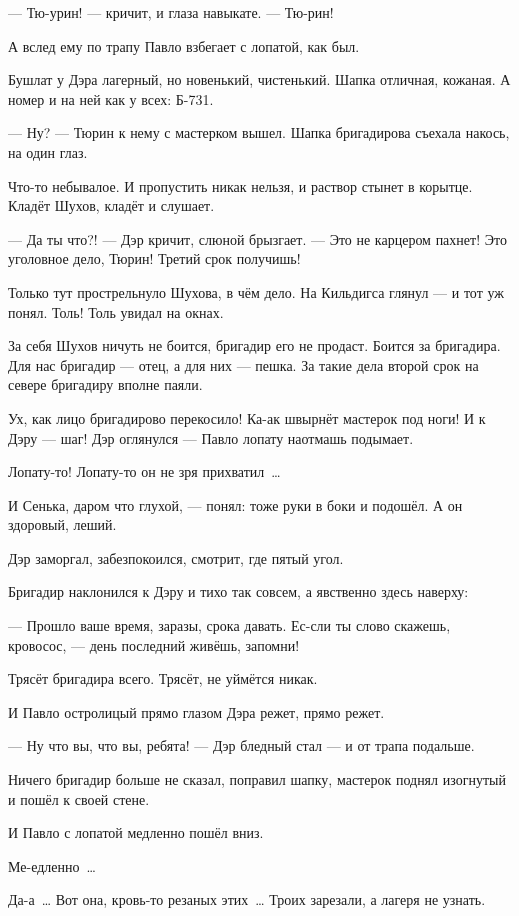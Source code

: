 --- Тю-урин! --- кричит, и глаза навыкате. --- Тю-рин!

А вслед ему по трапу Павло взбегает с лопатой, как был.

Бушлат у Дэра лагерный, но новенький, чистенький. Шапка отличная, кожаная. А номер и на ней 
как у всех: Б-731.

--- Ну? --- Тюрин к нему с мастерком вышел. Шапка бригадирова съехала накось, на один глаз.

Что-то небывалое. И пропустить никак нельзя, и раствор стынет в корытце. Кладёт Шухов, кладёт 
и слушает.

--- Да ты что?! --- Дэр кричит, слюной брызгает. --- Это не карцером пахнет! Это уголовное дело, 
Тюрин! Третий срок получишь!

Только тут прострельнуло Шухова, в чём дело. На Кильдигса глянул --- и тот уж понял. Толь! Толь 
увидал на окнах.

За себя Шухов ничуть не боится, бригадир его не продаст. Боится за бригадира. Для нас 
бригадир --- отец, а для них --- пешка. За такие дела второй срок на севере бригадиру вполне 
паяли.

Ух, как лицо бригадирово перекосило! Ка-ак швырнёт мастерок под ноги! И к Дэру --- шаг! Дэр 
оглянулся --- Павло лопату наотмашь подымает.

Лопату-то! Лопату-то он не зря прихватил~\dots{}

И Сенька, даром что глухой, --- понял: тоже руки в боки и подошёл. А он здоровый, леший.

Дэр заморгал, забезпокоился, смотрит, где пятый угол.

Бригадир наклонился к Дэру и тихо так совсем, а явственно здесь наверху:

--- Прошло ваше время, заразы, срока давать. Ес-сли ты слово скажешь, кровосос, --- день 
последний живёшь, запомни!

Трясёт бригадира всего. Трясёт, не уймётся никак.

И Павло остролицый прямо глазом Дэра режет, прямо режет.

--- Ну что вы, что вы, ребята! --- Дэр бледный стал --- и от трапа подальше.

Ничего бригадир больше не сказал, поправил шапку, мастерок поднял изогнутый и пошёл к своей 
стене.

И Павло с лопатой медленно пошёл вниз.

Ме-едленно~\dots{}

Да-а~\dots{} Вот она, кровь-то резаных этих~\dots{} Троих зарезали, а лагеря не узнать.

